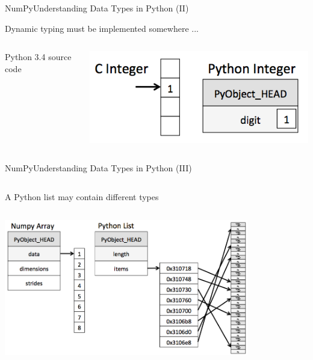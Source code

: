 \documentclass[10pt,compress]{beamer} %
\begin{document}
\begin{frame}{NumPy}{Understanding Data Types in Python (II)}

	Dynamic typing must be implemented somewhere ...

    \begin{columns}
			\begin{block}{\footnotesize{Python 3.4 source code}}
			\vspace{-0.2cm} 
				
			\vspace{-0.2cm} 
			\end{block}

			\includegraphics[width=\textwidth]{figs/cint_vs_pyint.png}	
	\end{columns}

\end{frame}

\begin{frame}[fragile]{NumPy}{Understanding Data Types in Python (III)}
	\begin{columns}
			A Python list may contain different types

	   \begin{exampleblock}{}
			\vspace{-0.2cm} 
			
			\vspace{-0.2cm} 
		\end{exampleblock}
	\end{columns}

	\bigskip

	\centering \includegraphics[width=0.8\textwidth]{figs/array_vs_list.png}	
\end{frame}
\end{document}
